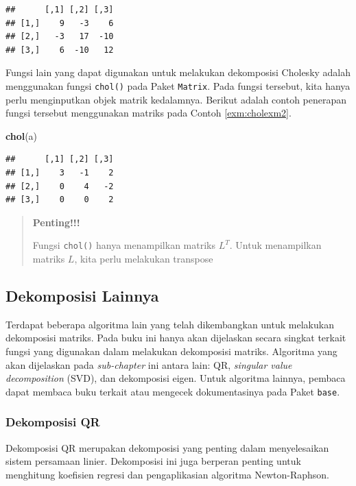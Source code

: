 \documentclass[
]{book}
\newenvironment{Shaded}{\begin{snugshade}}{\end{snugshade}}
\newcommand{\FunctionTok}[1]{\textcolor[rgb]{0.13,0.29,0.53}{\textbf{#1}}}
\newcommand{\NormalTok}[1]{#1}
\theoremstyle{definition}
\theoremstyle{definition}
\theoremstyle{definition}
\theoremstyle{definition}
\theoremstyle{remark}
\begin{document}
\begin{verbatim}
##      [,1] [,2] [,3]
## [1,]    9   -3    6
## [2,]   -3   17  -10
## [3,]    6  -10   12
\end{verbatim}

Fungsi lain yang dapat digunakan untuk melakukan dekomposisi Cholesky adalah menggunakan fungsi \texttt{chol()} pada Paket \texttt{Matrix}. Pada fungsi tersebut, kita hanya perlu menginputkan objek matrik kedalamnya. Berikut adalah contoh penerapan fungsi tersebut menggunakan matriks pada Contoh \ref{exm:cholexm2}.

\begin{Shaded}
\begin{Highlighting}[]
\FunctionTok{chol}\NormalTok{(a)}
\end{Highlighting}
\end{Shaded}

\begin{verbatim}
##      [,1] [,2] [,3]
## [1,]    3   -1    2
## [2,]    0    4   -2
## [3,]    0    0    2
\end{verbatim}

\begin{quote}
\textbf{Penting!!!}

Fungsi \texttt{chol()} hanya menampilkan matriks \(L^T\). Untuk menampilkan matriks \(L\), kita perlu melakukan transpose
\end{quote}

\hypertarget{othersdecomp}{%
\subsection{Dekomposisi Lainnya}\label{othersdecomp}}

Terdapat beberapa algoritma lain yang telah dikembangkan untuk melakukan dekomposisi matriks. Pada buku ini hanya akan dijelaskan secara singkat terkait fungsi yang digunakan dalam melakukan dekomposisi matriks. Algoritma yang akan dijelaskan pada \emph{sub-chapter} ini antara lain: QR, \emph{singular value decomposition} (SVD), dan dekomposisi eigen. Untuk algoritma lainnya, pembaca dapat membaca buku terkait atau mengecek dokumentasinya pada Paket \texttt{base}.

\hypertarget{qrdecomp}{%
\subsubsection{Dekomposisi QR}\label{qrdecomp}}

Dekomposisi QR merupakan dekomposisi yang penting dalam menyelesaikan sistem persamaan linier. Dekomposisi ini juga berperan penting untuk menghitung koefisien regresi dan pengaplikasian algoritma Newton-Raphson.
\end{document}
